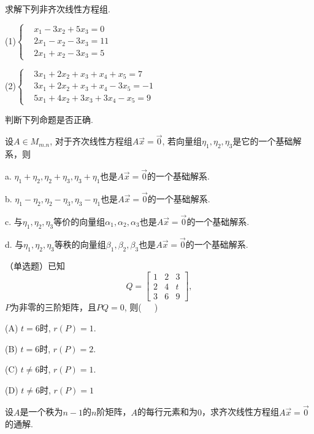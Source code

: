 \begin{ex}\label{5.12}
求解下列非齐次线性方程组.

(1)$\left\{\begin{aligned}&x_1-3x_2+5x_3=0 \\&2x_1-x_2-3x_3=11 \\&2x_1+x_2-3x_3=5     \end{aligned}\right.$

(2)$\left\{\begin{aligned}& 3x_1+2x_2+x_3+x_4+x_5=7 \\&3x_1+2x_2+x_3+x_4-3x_5=-1 \\&5x_1+4x_2+3x_3+3x_4-x_5=9    \end{aligned}\right.$
\end{ex}

\begin{ex}\label{5.13}
 判断下列命题是否正确.

设$A\in M_{m.n}$, 对于齐次线性方程组$A\vec{x}=\vec{0}$, 若向量组$\eta_1,\eta_2,\eta_3$是它的一个基础解系，则

a. $\eta_1+\eta_2, \eta_2+\eta_3, \eta_3+\eta_1$也是$A\vec{x}=\vec{0}$的一个基础解系.

b. $\eta_1-\eta_2, \eta_2-\eta_3, \eta_3-\eta_1$也是$A\vec{x}=\vec{0}$的一个基础解系.

c. 与$\eta_1,\eta_2,\eta_3$等价的向量组$\alpha_1,\alpha_2,\alpha_3$也是$A\vec{x}=\vec{0}$的一个基础解系.

d. 与$\eta_1,\eta_2,\eta_3$等秩的向量组$\beta_1,\beta_2,\beta_3$也是$A\vec{x}=\vec{0}$的一个基础解系.
\end{ex}

\begin{ex}\label{5.14}
（单选题）已知$$Q=\begin{bmatrix}1&2&3\\2&4&t\\3&6&9\end{bmatrix},$$ $P$为非零的三阶矩阵，且$PQ=0$, 则(\ \ \ )

(A) $t=6$时, $r(P)=1$.

(B) $t=6$时, $r(P)=2$.

(C) $t\not=6$时, $r(P)=1$.

(D) $t\not=6$时, $r(P)=1$
\end{ex}

\begin{ex}\label{5.15}
设$A$是一个秩为$n-1$的$n$阶矩阵，$A$的每行元素和为$0$，求齐次线性方程组$A\vec{x}=\vec{0}$的通解.
\end{ex}

